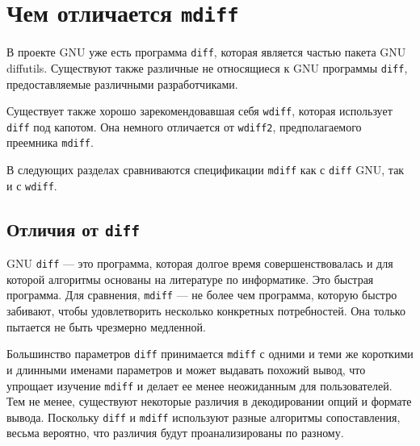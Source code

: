 \hypertarget{_0421_043e_0432_043c_0435_0441_0442_0438_043c_043e_0441_0442_044c}{%
\section{\texorpdfstring{Чем отличается
\texttt{mdiff}}{Чем отличается mdiff}}\label{_0421_043e_0432_043c_0435_0441_0442_0438_043c_043e_0441_0442_044c}}

В проекте GNU уже есть программа \texttt{diff}, которая является частью
пакета GNU diffutils. Существуют также различные не относящиеся к GNU
программы \texttt{diff}, предоставляемые различными разработчиками.

Существует также хорошо зарекомендовавшая себя \texttt{wdiff}, которая
использует \texttt{diff} под капотом. Она немного отличается от
\texttt{wdiff2}, предполагаемого преемника \texttt{mdiff}.

В следующих разделах сравниваются спецификации \texttt{mdiff} как с
\texttt{diff} GNU, так и с \texttt{wdiff}.

\hypertarget{_0421_043e_0432_043c_0435_0441_0442_0438_043c_043e_0441_0442_044c-_0441-diff}{%
\subsection{\texorpdfstring{Отличия от
\texttt{diff}}{Отличия от diff}}\label{_0421_043e_0432_043c_0435_0441_0442_0438_043c_043e_0441_0442_044c-_0441-diff}}

GNU \texttt{diff} --- это программа, которая долгое время
совершенствовалась и для которой алгоритмы основаны на литературе по
информатике. Это быстрая программа. Для сравнения, \texttt{mdiff} --- не
более чем программа, которую быстро забивают, чтобы удовлетворить
несколько конкретных потребностей. Она только пытается не быть чрезмерно
медленной.

Большинство параметров \texttt{diff} принимается \texttt{mdiff} с одними
и теми же короткими и длинными именами параметров и может выдавать
похожий вывод, что упрощает изучение \texttt{mdiff} и делает ее менее
неожиданным для пользователей. Тем не менее, существуют некоторые
различия в декодировании опций и формате вывода. Поскольку \texttt{diff}
и \texttt{mdiff} используют разные алгоритмы сопоставления, весьма
вероятно, что различия будут проанализированы по разному.

